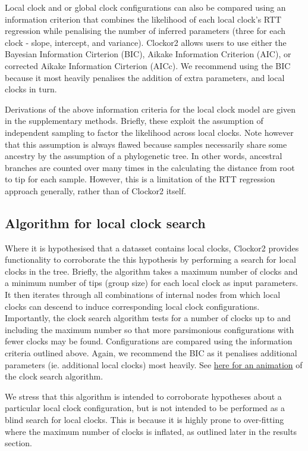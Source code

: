 \documentclass{article}
\begin{document}
Local clock and or global clock configurations can also be compared using an information criterion that combines the likelihood of each local clock's RTT regression while penalising the number of inferred parameters (three for each clock - slope, intercept, and variance). Clockor2 allows users to use either the Bayesian Information Cirterion (BIC), Aikake Information Criterion (AIC), or corrected Aikake Information Cirterion (AICc). We recommend using the BIC because it most heavily penalises the addition of extra parameters, and local clocks in turn.

Derivations of the above information criteria for the local clock model are given in the supplementary methods. Briefly, these exploit the assumption of independent sampling to factor the likelihood across local clocks. Note however that this assumption is always flawed because samples necessarily share some ancestry by the assumption of a phylogenetic tree. In other words, ancestral branches are counted over many times in the calculating the distance from root to tip for each sample. However, this is a limitation of the RTT regression approach generally, rather than of Clockor2 itself.


\subsection*{Algorithm for local clock search}
Where it is hypothesised that a datasset contains local clocks, Clockor2 provides functionality to corroborate the this hypothesis by performing a search for local clocks in the tree. Briefly, the algorithm takes a maximum number of clocks and a minimum number of tips (group size) for each local clock as input parameters. It then iterates through all combinations of internal nodes from which local clocks can descend to induce corresponding local clock configurations. Importantly, the clock search algorithm tests for a number of clocks up to and including the maximum number so that more parsimonious configurations with fewer clocks may be found. Configurations are compared using the information criteria outlined above. Again, we recommend the BIC as it penalises additional parameters (ie. additional local clocks) most heavily. See \href{https://github.com/LeoFeatherstone/clockor2Paper/blob/main/figures/clockSearchEg2Clocks.gif}{here for an animation} of the clock search algorithm. 

We stress that this algorithm is intended to corroborate hypotheses about a particular local clock configuration, but is not intended to be performed as a blind search for local clocks. This is because it is highly prone to over-fitting where the maximum number of clocks is inflated, as outlined later in the results section.
\end{document}
